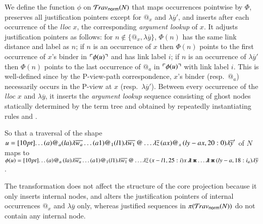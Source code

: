 \documentclass{elsarticle}
\newif\iflongversion
\theoremstyle{plain}
\theoremstyle{definition}
\newcommand{\ghostlmd}{{\lambda\mkern-7mu \lambda}}
\newcommand{\ghostvar}{\mathsf{x\mkern-5mu x}}
\newcommand{\normalizing}{{\sf norm}}
\newcommand{\travsetnorm}{\travset_\normalizing} %
\def\coresymbol{\pi} %
\newcommand\bulklambda[1]{{\lambda\overline{#1}}}
\begin{document}
We define the function $\phi$ on $\travsetnorm(N)$
that maps occurrences pointwise by $\Phi$,
preserves all justification pointers except
for $@_x$ and $\lambda\overline{y}'$,
and inserts after each occurrence of the \emph{lloc} $x$, the corresponding \emph{argument lookup} of $x$.
It adjusts justification pointers as follows:
for $n\not\in \{ @_x, \lambda\overline{y} \}$, $\Phi(n)$ has the same link distance and label as $n$;
if $n$ is an occurrence of $x$ then $\Phi(n)$ points to the first occurrence of $x$'s binder in $\ulcorner \phi(u) \urcorner$ and has link label $i$;
if $n$ is an occurrence of $\lambda\overline{y}'$ then  $\Phi(n)$ points to the last occurrence of $@_a$ in $\ulcorner \phi(u) \urcorner$ with link label $i$.
This is well-defined since by the P-view-path correspondence, $x$'s binder (resp.\ $@_a$) necessarily occurs in the P-view at $x$ (resp.\ $\lambda\overline{y}'$).
%
Between every occurrence of the \emph{lloc} $x$ and $\lambda\overline{y}$,
it inserts the \emph{argument lookup} sequence consisting of ghost
nodes statically determined by the term tree and obtained by repeatedly instantiating rules  and .
%
\iflongversion
Take a traversal $u \in \travset(N)$ involving $@_x$, its image $\phi(u)$ is given by:
\begin{eqnarray*}
    u &=& \Pstr[10pt]{ \ldots (aa){@_a} \cdot (la){\bulklambda{w_a}} \cdot \ldots (a1){@_1} \cdot (l1){\bulklambda{w_1}} \cdot @ \ldots \bulklambda{z} \cdot (ax){@_x} \cdot (ly-ax,20:0){\bulklambda{y}'} }
    \\
    \phi(u) &=& \Pstr[10pt]{ \ldots (aa){@_a} \cdot (la){\bulklambda{w_a}} \cdot \ldots (a1){@_1} \cdot (l1){\bulklambda{w_1}} \cdot @ \ldots \bulklambda{z} \cdot (x-l1,30:i) x \cdot \ghostlmd \cdot \ghostvar \ldots \ghostlmd \cdot \ghostvar \cdot (ly-a,20:i_a){\bulklambda{y}} }
\end{eqnarray*}
\else
So that a traversal of the shape
$u = \Pstr[10pt]{ \ldots(a){@_a} (la){\bulklambda{w_a}}
  \ldots (a1){@_1} (l1){\bulklambda{w_1}} \, @ \ldots \bulklambda{z} \, (ax){@_x} \, (ly-ax,20:0){\bulklambda{y}'} }$ of $N$
maps to
$\phi(u) = \Pstr[10pt]{ \ldots (a){@_a} \, (la){\bulklambda{w_a}}
\ldots (a1){@_1}  (l1){\bulklambda{w_1}} \, @ \ldots \bulklambda{z} \, (x-l1,25:i) x \, \ghostlmd \, \ghostvar \ldots \ghostlmd \, \ghostvar \, (ly-a,18:i_a){\bulklambda{y}}}$.
\fi
The transformation does not affect the structure
of the core projection
because it only inserts internal nodes, and alters the justification pointers of internal occurrences $@_x$ and $\lambda\overline y$ only,
whereas justified sequences in $\coresymbol(\travsetnorm(N))$ do not contain any internal node.
\end{document}
